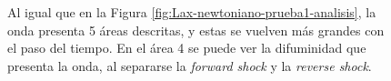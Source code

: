 \documentclass[12pt,a4paper]{book}
\begin{document}
\begin{figure}
\centering
{}
\caption{\label{fig:Lax-prueba2_no_centrado-analisis}Al igual que en la Figura \ref{fig:Lax-newtoniano-prueba1-analisis}, la onda presenta 5 áreas descritas, y estas se vuelven más grandes con el paso del tiempo. En el área 4 se puede ver la difuminidad que presenta la onda, al separarse la \emph{forward shock} y la \emph{reverse shock}.} 
\end{figure}
\end{document}
